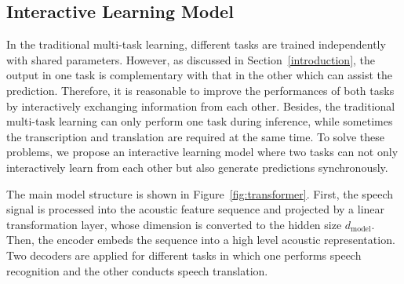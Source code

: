 \documentclass[letterpaper]{article} %
\begin{document}
\subsection{Interactive Learning Model}
In the traditional multi-task learning, different tasks are trained independently with shared parameters. However, as discussed in Section~\ref{introduction}, the output in one task is complementary with that in the other which can assist the prediction. Therefore, it is reasonable to improve the performances of both tasks by interactively exchanging information from each other. Besides, the traditional multi-task learning can only perform one task during inference, while sometimes the transcription and translation are required at the same time. To solve these problems, we propose an interactive learning model where two tasks can not only interactively learn from each other but also generate predictions synchronously.

The main model structure is shown in Figure~\ref{fig:transformer}. First, the speech signal is processed into the acoustic feature sequence and projected by a linear transformation layer, whose dimension is converted to the hidden size $d_{\textrm{model}}$. Then, the encoder embeds the sequence into a high level acoustic representation. Two decoders are applied for different tasks in which one performs speech recognition and the other conducts speech translation. 
\end{document}
